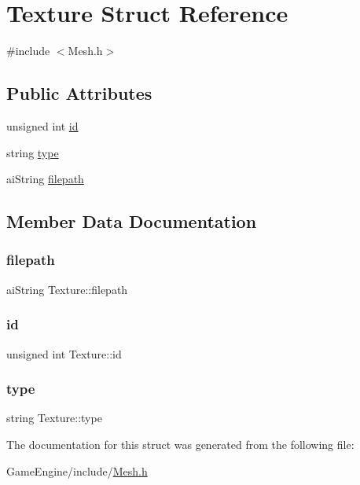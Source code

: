 \hypertarget{struct_texture}{}\section{Texture Struct Reference}
\label{struct_texture}


{\ttfamily \#include $<$Mesh.\+h$>$}

\subsection*{Public Attributes}
\begin{DoxyCompactItemize}
\item 
unsigned int \mbox{\hyperlink{struct_texture_aed42161a5c00b6020c85833401da6da6}{id}}
\item 
string \mbox{\hyperlink{struct_texture_adacb495ed5140ec76a09cd130e7d5c32}{type}}
\item 
ai\+String \mbox{\hyperlink{struct_texture_a69c8def64c608063b2ecb7fd785121ee}{filepath}}
\end{DoxyCompactItemize}


\subsection{Member Data Documentation}
\mbox{\label{struct_texture_a69c8def64c608063b2ecb7fd785121ee}} 
\subsubsection{\texorpdfstring{filepath}{filepath}}
{\footnotesize\ttfamily ai\+String Texture\+::filepath}

\mbox{\label{struct_texture_aed42161a5c00b6020c85833401da6da6}} 
\subsubsection{\texorpdfstring{id}{id}}
{\footnotesize\ttfamily unsigned int Texture\+::id}

\mbox{\label{struct_texture_adacb495ed5140ec76a09cd130e7d5c32}} 
\subsubsection{\texorpdfstring{type}{type}}
{\footnotesize\ttfamily string Texture\+::type}



The documentation for this struct was generated from the following file\+:\begin{DoxyCompactItemize}
\item 
Game\+Engine/include/\mbox{\hyperlink{_mesh_8h}{Mesh.\+h}}\end{DoxyCompactItemize}
